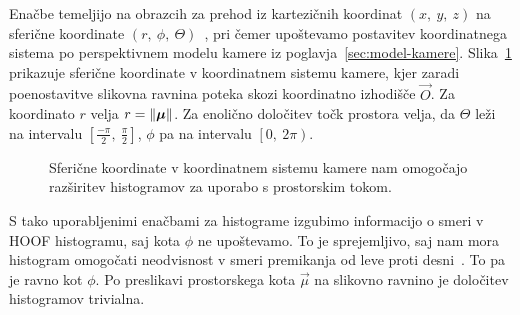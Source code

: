 Enačbe temeljijo na obrazcih za prehod iz kartezičnih koordinat $(x, ~y, ~z)$ na sferične koordinate $(r,~\phi,~\Theta)$~\cite{bronstein1990math}, pri čemer upoštevamo postavitev koordinatnega sistema po perspektivnem modelu kamere iz poglavja~\ref{sec:model-kamere}. Slika~\ref{fig:sphere} prikazuje sferične koordinate v koordinatnem sistemu kamere, kjer zaradi poenostavitve slikovna ravnina poteka skozi koordinatno izhodišče $\vec{O}$. Za koordinato $r$ velja $r=\left\lVert {\boldsymbol{\mu}} \right\rVert$. Za enolično določitev točk prostora velja, da $\Theta$ leži na intervalu $\left[\frac{-\pi}{2},~\frac{\pi}{2}\right]$, $\phi$ pa na intervalu $\left[0,~2\pi\right)$.

\begin{figure}[htb]
	\centering
	
	\caption[Sferične koordinate v koordinatnem sistemu kamere]{Sferične koordinate v koordinatnem sistemu kamere nam omogočajo razširitev histogramov za uporabo s prostorskim tokom.}
	\label{fig:sphere}
\end{figure}

S tako uporabljenimi enačbami za histograme izgubimo informacijo o smeri v HOOF histogramu, saj kota $\phi$ ne upoštevamo. To je sprejemljivo, saj nam mora histogram omogočati neodvisnost v smeri premikanja od leve proti desni~\cite{chaudhry2009histograms}. To pa je ravno kot $\phi$. Po preslikavi prostorskega kota $\vec{\mu}$ na slikovno ravnino je določitev histogramov trivialna. 
